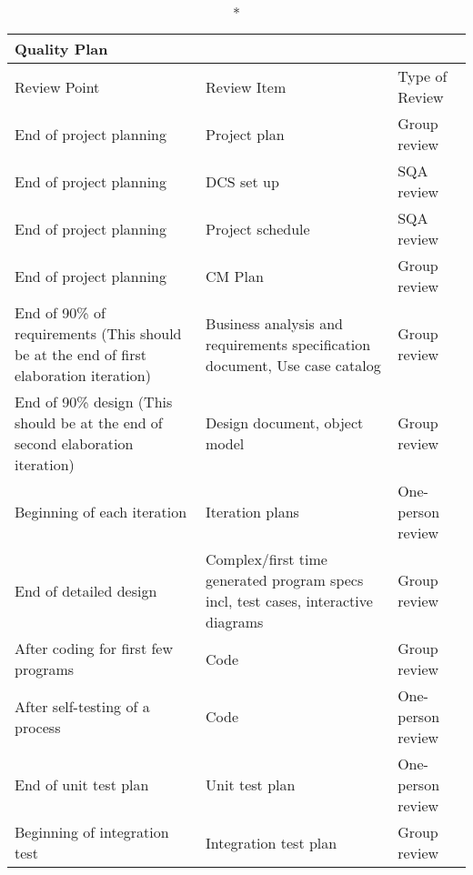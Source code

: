 \documentclass[a4paper,11pt]{article}
\begin{document}
\begin{center}
\begin{longtable}{|L|L|L|}
\caption*{Quality Plan} \\
\hline Review Point                                                & Review Item                      & Type of Review \\
\hline End of project planning                                     & Project plan                     & Group review \\
\hline End of project planning                                     & DCS set up                       & SQA review \\
\hline End of project planning                                     & Project schedule                 & SQA review \\
\hline End of project planning                                     & CM Plan                          & Group review \\
\hline End of 90\% of requirements (This should be at the end of 
first elaboration iteration)                                       & Business analysis and 
                                                                     requirements specification 
                                                                     document, Use case catalog       & Group review \\
\hline End of 90\% design (This should be at the end of second 
elaboration iteration)                                             & Design document, object model    & Group review \\
\hline Beginning of each iteration                                 & Iteration plans                  & One-person review \\
\hline End of detailed design                                      & Complex/first time generated 
                                                                     program specs incl, test cases, 
                                                                     interactive diagrams             & Group review \\
\hline After coding for first few programs                         & Code                             & Group review \\
\hline After self-testing of a process                             & Code                             & One-person review \\
\hline End of unit test plan                                       & Unit test plan                   & One-person review \\
\hline Beginning of integration test                               & Integration test plan            & Group review \\
\hline
\end{longtable}
\end{center}
\end{document}
